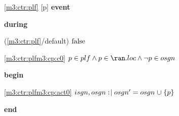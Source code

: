 \noindent \ref{m3:ctr:plf} [p] \textbf{event}
\begin{block}
  \item   \textbf{during}
  \begin{block}
  \item[ (\ref{m3:ctr:plf}/default) ]\sout{$\text{false}$} %
  \end{block}
  \begin{block}
  \item[ \eqref{m3:ctr:plfm3:cp:c0} ]{$p \in plf \land p \in \ran.loc \land \neg p \in osgn $} %
  \end{block}
  \item   \textbf{begin}
  \begin{block}
  \item[ \eqref{m3:ctr:plfm3:cp:act0} ]{$isgn,osgn \mathrel{:\mkern1mu\mid} osgn' = osgn \mathbin{\mkern1mu\cup\mkern1mu} \{ p \} $} %
  \end{block}
  \item   \textbf{end} \\
\end{block}
